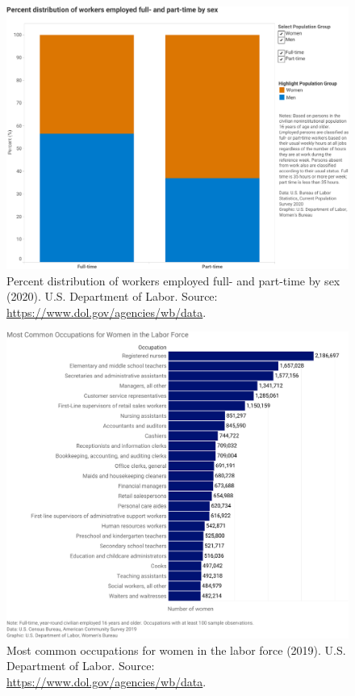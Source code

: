 \begin{figure}[t!]
\includegraphics[scale=.7]{figures/dol_full-_and_part-time_workers_by_sex.pdf}
\centering
\caption{Percent distribution of workers employed full- and part-time by sex (2020).\newline
U.S. Department of Labor. Source: \upshape\protect\url{https://www.dol.gov/agencies/wb/data}.}
\label{fig:dol_full-_and_part-time_workers_by_sex}
\end{figure}

\begin{figure}[t!]
\includegraphics[scale=.7]{figures/dol_most_common_occupations_women.pdf}
\centering
\caption{Most common occupations for women in the labor force (2019).\newline
U.S. Department of Labor. Source: \upshape\protect\url{https://www.dol.gov/agencies/wb/data}.}
\label{fig:dol_most_common_occupations_women}
\end{figure}

